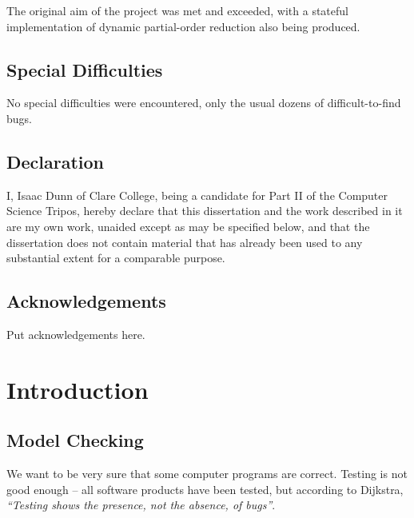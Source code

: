 \documentclass[12pt,a4paper,twoside,openright]{report}
\begin{document}
The original aim of the project was met and exceeded, with
a stateful implementation of dynamic partial-order reduction
also being produced.

\section*{Special Difficulties}

No special difficulties were encountered, only the usual dozens of
difficult-to-find bugs.
 
\newpage
\section*{Declaration}

I, Isaac Dunn of Clare College, being a candidate for Part II of the Computer
Science Tripos, hereby declare
that this dissertation and the work described in it are my own work,
unaided except as may be specified below, and that the dissertation
does not contain material that has already been used to any substantial
extent for a comparable purpose.

\bigskip
{}

\bigskip
{}

\tableofcontents

\listoffigures

\newpage
\section*{Acknowledgements}

Put acknowledgements here.


\pagestyle{headings}

\chapter{Introduction}

\section{Model Checking}
We want to be very sure that some computer
programs are correct. Testing is not good
enough -- all software products have been
tested, but according to Dijkstra,
\emph{``Testing shows the presence,
	not the absence, of bugs''}.
\end{document}
